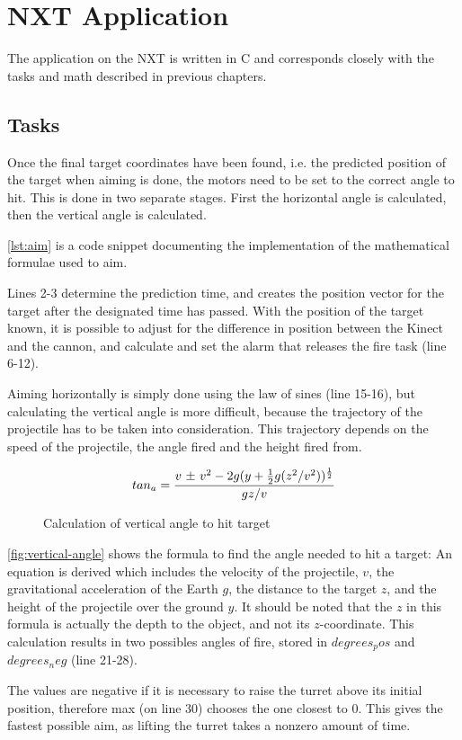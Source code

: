 \section{NXT Application}
The application on the NXT is written in C and corresponds closely with the tasks and math described in previous chapters.

\subsection{Tasks}
Once the final target coordinates have been found, i.e. the predicted position of the target when aiming is done, the motors need to be set to the correct angle to hit. This is done in two separate stages. First the horizontal angle is calculated, then the vertical angle is calculated.

\autoref{lst:aim} is a code snippet documenting the implementation of the mathematical formulae used to aim.


Lines 2-3 determine the prediction time, and creates the position vector for the target after the designated
time has passed. With the position of the target known, it is possible to adjust for the difference in position 
between the Kinect and the cannon, and calculate and set the alarm that releases the fire task (line 6-12).

Aiming horizontally is simply done using the law of sines (line 15-16), but calculating the vertical angle is more difficult, because the trajectory of the projectile has to be taken into consideration. This trajectory depends on the speed of the projectile, the angle fired and the height fired from.

\begin{figure}[htbp]
$$tan_a = {v \text{ \textpm} \text{ } v^2 - 2g(y + {1 \over 2}g(z^2/v^2))^{1 \over 2} \over gz/v}$$
\caption{Calculation of vertical angle to hit target}
\label{fig:vertical-angle}
\end{figure}

\autoref{fig:vertical-angle} shows the formula to find the angle needed to hit a target: An equation is derived which  
includes the velocity of the projectile, $v$, the gravitational acceleration of the Earth $g$, the distance to the
target $z$, and the height of the projectile over the ground $y$. It should be noted that the $z$ in this formula
is actually the depth to the object, and not its $z$-coordinate. This calculation results in two possibles angles
of fire, stored in $degrees_pos$ and $degrees_neg$ (line 21-28).

The values are negative if it is necessary to raise the turret above its initial position, therefore max (on line 30)
chooses the one closest to 0\textdegree . This gives the fastest possible aim, as lifting the turret takes a nonzero
amount of time.
